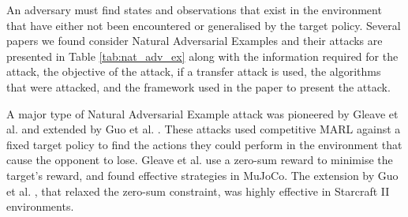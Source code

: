 \documentclass[conference,compsoc]{IEEEtran}
\begin{document}
An adversary must find states and observations that exist in the environment that have either not been encountered or generalised by the target policy. Several papers we found consider Natural Adversarial Examples \cite{uesato_adversarial_2018, wu_adversarial_2021, guo_adversarial_2021, pan_improving_2021, phan_learning_2020, gleave_adversarial_2020} and their attacks are presented in Table \ref{tab:nat_adv_ex} along with the information required for the attack, the objective of the attack, if a transfer attack is used, the algorithms that were attacked, and the framework used in the paper to present the attack.


A major type of Natural Adversarial Example attack was pioneered by Gleave et al. \cite{gleave_adversarial_2020} and extended by Guo et al. \cite{guo_adversarial_2021}. These attacks used competitive MARL against a fixed target policy to find the actions they could perform in the environment that cause the opponent to lose. Gleave et al. \cite{gleave_adversarial_2020} use a zero-sum reward to minimise the target's reward, and found effective strategies in MuJoCo. The extension by Guo et al. \cite{guo_adversarial_2021}, that relaxed the zero-sum constraint, was highly effective in Starcraft II environments.

\end{document}
